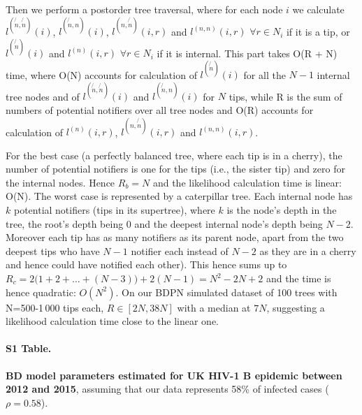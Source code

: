 \documentclass[10pt,letterpaper]{article}
\begin{document}
 Then we perform a postorder tree traversal, where for each node $i$ we calculate $l^{(\not{n}, \not{n})}(i)$, $l^{(\not{n}, n)}(i)$, $l^{(n, \not{n})}(i, r)$ and $l^{(n, n)}(i, r)$ $\forall r \in N_i$ if it is a tip, or $l^{(\not{n})}(i)$ and $l^{(n)}(i, r)$ $\forall r \in N_i$ if it is internal.
This part takes O(R + N) time, where O(N) accounts for calculation of $l^{(\not{n})}(i)$ for all the $N - 1$ internal tree nodes and of $l^{(\not{n}, \not{n})}(i)$ and $l^{(\not{n}, n)}(i)$ for $N$ tips, while R is the sum of numbers of potential notifiers over all tree nodes and O(R) accounts for calculation of $l^{(n)}(i, r)$, $l^{(n, \not{n})}(i, r)$ and $l^{(n, n)}(i, r)$. 

For the best case (a perfectly balanced tree, where each tip is in a cherry), the number of potential notifiers is one for the tips (i.e., the sister tip) and zero for the internal nodes. Hence $R_b = N$ and the likelihood calculation time is linear: O(N). The worst case  is represented by a caterpillar tree. Each internal node has $k$ potential notifiers (tips in its supertree), where $k$ is the node's depth in the tree, the root's depth being 0 and the deepest internal node's depth being $N-2$. Moreover each tip has as many notifiers as its parent node, apart from the two deepest tips who have $N-1$ notifier each instead of $N-2$ as they are in a cherry and hence could have notified each other). This hence sums up to $R_c = 2\big(1 + 2 + \ldots + (N-3)\big) + 2(N-1) = N^2 - 2N + 2$ and the time is hence quadratic: $O(N^2)$. On our BDPN simulated dataset of 100 trees with N=500-1\,000 tips each, $R \in [2N, 38N]$ with a median at $7N$, suggesting a likelihood calculation time close to the linear one.


\paragraph*{S1 Table.}
\label{S1_Table}
{\bf BD model parameters estimated for UK HIV-1 B epidemic between 2012 and 2015}, assuming that our data represents 58\% of infected cases ($\rho=0.58$).
\end{document}
